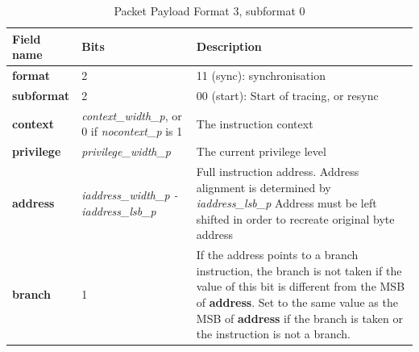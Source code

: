 \begin{table}[htp]
  \centering
  \caption{Packet Payload Format 3, subformat 0}
  \label{tab:te_inst3}
  \begin{tabulary}{\textwidth}{|l|p{35mm}|p{80mm}|}
    \hline
    {\bf Field name} & {\bf Bits} & {\bf Description} \\
    \hline
    \textbf{format} & 2 & 11 (sync): synchronisation\\
    \hline
    \textbf{subformat} & 2 & 00 (start): Start of tracing, or resync \\
    \hline
    \textbf{context} &  \textit {context\_width\_p}, 
               or 0 if \textit {nocontext\_p} is 1 & 
               The instruction context \\
    \hline
    \textbf{privilege} & \textit {privilege\_width\_p} & 
                The current privilege level \\
    \hline
    \textbf{address} & \textit {iaddress\_width\_p - iaddress\_lsb\_p} & 
              Full instruction address.  Address alignment is determined by \textit {iaddress\_lsb\_p} Address must be left shifted in order to recreate original byte address \\
    \hline
    \textbf{branch} & 1 & If the address points to a branch instruction, the branch is not taken if the value of this bit is different from the MSB of \textbf{address}. 
    Set to the same value as the MSB of \textbf{address} if the branch is taken or the instruction is not a branch. \\
    \hline
  \end{tabulary}
\end{table}

